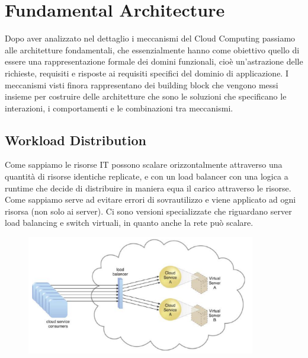 \chapter{Fundamental Architecture}
Dopo aver analizzato nel dettaglio i meccanismi del Cloud Computing passiamo alle architetture fondamentali, che essenzialmente hanno come obiettivo quello di essere una rappresentazione formale dei domini funzionali, cioè un'astrazione delle richieste, requisiti e risposte ai requisiti specifici del dominio di applicazione. I meccanismi visti finora rappresentano dei building block che vengono messi insieme per costruire delle architetture che sono le soluzioni che specificano le interazioni, i comportamenti e le combinazioni tra meccanismi. 

\section{Workload Distribution}
Come sappiamo le risorse IT possono scalare orizzontalmente attraverso una quantità di risorse identiche replicate, e con un load balancer con una logica a runtime che decide di distribuire in maniera equa il carico attraverso le risorse. Come sappiamo serve ad evitare errori di sovrautilizzo e viene applicato ad ogni risorsa (non solo ai server). Ci sono versioni specializzate che riguardano server load balancing e switch virtuali, in quanto anche la rete può scalare. 

\begin{figure}[htb!]
    \centering
    \includegraphics[width=10cm]{./Images/cap11/11.1.png}
\end{figure}

